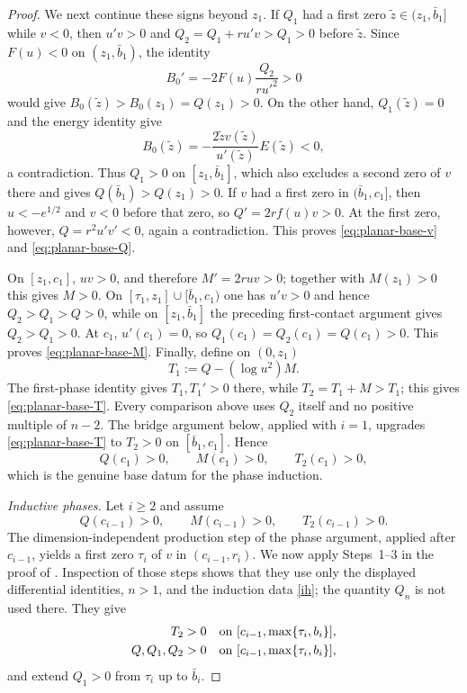 \documentclass[11pt]{article}
\begin{document}
\begin{proof}
We next continue these signs beyond $z_1$. If $Q_1$ had a first zero
$\tilde z\in(z_1,\bar b_1]$ while $v<0$, then
$u'v>0$ and $Q_2=Q_1+ru'v>Q_1>0$ before $\tilde z$. Since
$F(u)<0$ on $(z_1,\bar b_1)$, the identity
\[
 B_0'=-2F(u)\frac{Q_2}{ru'^2}>0
\]
would give $B_0(\tilde z)>B_0(z_1)=Q(z_1)>0$. On the other hand,
$Q_1(\tilde z)=0$ and the energy identity give
\[
 B_0(\tilde z)
 =-\frac{2\tilde zv(\tilde z)}{u'(\tilde z)}
 E(\tilde z)<0,
\]
a contradiction. Thus $Q_1>0$ on $[z_1,\bar b_1]$, which also excludes
a second zero of $v$ there and gives
$Q(\bar b_1)>Q(z_1)>0$. If $v$ had a first zero in
$(\bar b_1,c_1]$, then $u< -e^{1/2}$ and $v<0$ before that zero, so
$Q'=2rf(u)v>0$. At the first zero, however,
$Q=r^2u'v'<0$, again a contradiction. This proves
\eqref{eq:planar-base-v} and \eqref{eq:planar-base-Q}.

On $[z_1,c_1]$, $uv>0$, and therefore $M'=2ruv>0$; together with
$M(z_1)>0$ this gives $M>0$. On
$[\tau_1,z_1]\cup[\bar b_1,c_1)$ one has $u'v>0$ and hence
$Q_2>Q_1>Q>0$, while on $[z_1,\bar b_1]$ the preceding first-contact
argument gives $Q_2>Q_1>0$. At $c_1$, $u'(c_1)=0$, so
$Q_1(c_1)=Q_2(c_1)=Q(c_1)>0$. This proves
\eqref{eq:planar-base-M}. Finally, define on $(0,z_1)$
\[
 T_1:=Q-(\log u^2)M.
\]
The first-phase identity gives $T_1,T_1'>0$ there, while
$T_2=T_1+M>T_1$; this gives \eqref{eq:planar-base-T}. Every comparison
above uses $Q_2$ itself and no positive multiple of $n-2$. The bridge
argument below,
applied with $i=1$, upgrades \eqref{eq:planar-base-T} to
$T_2>0$ on $[\bar b_1,c_1]$. Hence
\begin{equation}\label{eq:planar-base-end}
 Q(c_1)>0,
 \qquad M(c_1)>0,
 \qquad T_2(c_1)>0,
\end{equation}
which is the genuine base datum for the phase induction.

\medskip
\noindent\emph{Inductive phases.}
Let $i\ge2$ and assume
\begin{equation}\label{ih}
Q(c_{i-1})>0,\qquad M(c_{i-1})>0,\qquad T_2(c_{i-1})>0.
\end{equation}
{The dimension-independent production step of the phase argument,
applied after $c_{i-1}$, yields a first zero $\tau_i$ of $v$ in
$(c_{i-1},r_i)$.}  We now apply Steps~1--3 in the
proof of \cite[Proposition~3.4]{LiuSunZou}.  Inspection of those steps shows
that they use only the displayed differential identities, $n>1$, and the
induction data \eqref{ih}; the quantity $Q_n$ is not used there.  They give
\begin{align*}
T_2&>0
\quad\hbox{on }[c_{i-1},\max\{\tau_i,b_i\}],\\
Q,Q_1,Q_2&>0
\quad\hbox{on }[c_{i-1},\max\{\tau_i,b_i\}],
\end{align*}
and extend \(Q_1>0\) from \(\tau_i\) up to \(\bar b_i\).


\end{proof}
\end{document}
